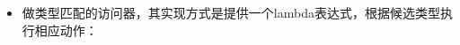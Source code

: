 \begin{itemize}
\begin{codeblockbg}
\begin{Verbatim}[commandchars=\\\{\},breaklines=true,breakanywhere=true,fontsize=\codefont,xleftmargin=17bp]
\PYG{+w}{  }\PYG{p}{\PYGZcb{}}
\PYG{p}{\PYGZcb{}}\PYG{p}{;}
\PYG{k}{for}\PYG{+w}{ }\PYG{p}{(}\PYG{k}{auto}\PYG{+w}{ }\PYG{k}{const}\PYG{+w}{ }\PYG{o}{\PYGZam{}}\PYG{+w}{ }\PYG{n}{d}\PYG{+w}{ }\PYG{o}{:}\PYG{+w}{ }\PYG{n}{dvds}\PYG{p}{)}
\PYG{p}{\PYGZob{}}
\PYG{+w}{  }\PYG{n}{std}\PYG{o}{:}\PYG{o}{:}\PYG{n}{visit}\PYG{p}{(}\PYG{n}{visitor\PYGZus{}functor}\PYG{p}{(}\PYG{p}{)}\PYG{p}{,}\PYG{+w}{ }\PYG{n}{d}\PYG{p}{)}\PYG{p}{;}
\PYG{p}{\PYGZcb{}}
\end{Verbatim}
\end{codeblockbg}



\item 做类型匹配的访问器，其实现方式是提供一个lambda表达式，根据候选类型执行相应动作：




\end{itemize}
